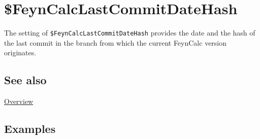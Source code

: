 \documentclass[../FeynCalcManual.tex]{subfiles}
\begin{document}
\hypertarget{dollarfeyncalclastcommitdatehash}{
\section{\$FeynCalcLastCommitDateHash}\label{dollarfeyncalclastcommitdatehash}}

The setting of \texttt{\$FeynCalcLastCommitDateHash} provides the date
and the hash of the last commit in the branch from which the current
FeynCalc version originates.

\subsection{See also}

\hyperlink{toc}{Overview}

\subsection{Examples}
\end{document}
